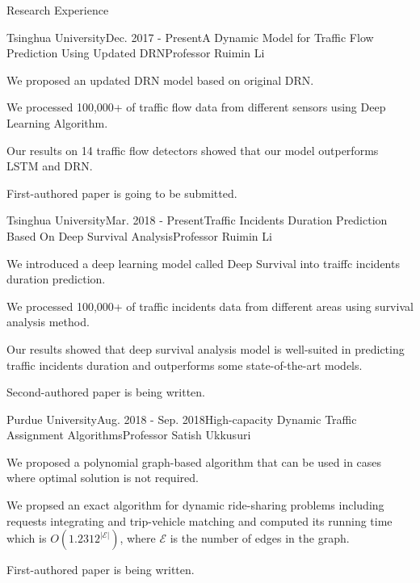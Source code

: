 \documentclass{resume} %
\begin{document}
\begin{rSection}{Research Experience}

\begin{rSubsection}{Tsinghua University}{Dec. 2017 - Present}{A Dynamic Model for Traffic Flow Prediction Using Updated DRN}{Professor Ruimin Li}
\item We proposed an updated DRN model based on original DRN.
\item We processed 100,000+ of traffic flow data from different sensors using Deep Learning Algorithm.
\item Our results on 14 traffic flow detectors showed that our model outperforms LSTM and DRN.
\item First-authored paper is going to be submitted.
\end{rSubsection}

\begin{rSubsection}{Tsinghua University}{Mar. 2018 - Present}{Traffic Incidents Duration Prediction Based On Deep Survival Analysis}{Professor Ruimin Li}
\item We introduced a deep learning model called Deep Survival into traiffc incidents duration prediction.
\item We processed 100,000+ of traffic incidents data from different areas using survival analysis method.
\item Our results showed that deep survival analysis model is well-suited in predicting traffic incidents duration and outperforms some state-of-the-art models.
\item Second-authored paper is being written.
\end{rSubsection}



\begin{rSubsection}{Purdue University}{Aug. 2018 - Sep. 2018}{High-capacity Dynamic Traffic Assignment Algorithms}{Professor Satish Ukkusuri}
\item We proposed a polynomial graph-based algorithm that can be used in cases where optimal solution is not required.
\item We propsed an exact algorithm for dynamic ride-sharing problems including requests integrating and trip-vehicle matching and computed its running time which is $O(1.2312^{|\mathcal{E}|})$, where $\mathcal{E}$ is the number of edges in the graph.
\item First-authored paper is being written.
\end{rSubsection}


\end{rSection}
\end{document}

